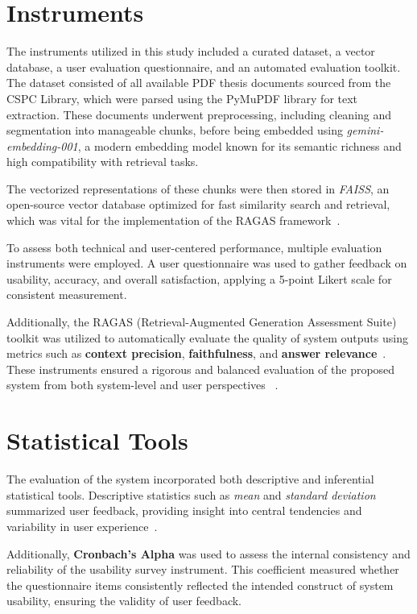 \begin{refsection}
\section{Instruments}


The instruments utilized in this study included a curated dataset, a vector database, a user evaluation questionnaire, and an automated evaluation toolkit. The dataset consisted of all available PDF thesis documents sourced from the CSPC Library, which were parsed using the PyMuPDF library for text extraction. These documents underwent preprocessing, including cleaning and segmentation into manageable chunks, before being embedded using \textit{gemini-embedding-001}, a modern embedding model known for its semantic richness and high compatibility with retrieval tasks.


The vectorized representations of these chunks were then stored in \textit{FAISS}, an open-source vector database optimized for fast similarity search and retrieval, which was vital for the implementation of the RAGAS framework~\cite{trychroma2023chroma}.

To assess both technical and user-centered performance, multiple evaluation instruments were employed. A user questionnaire was used to gather feedback on usability, accuracy, and overall satisfaction, applying a 5-point Likert scale for consistent measurement.

Additionally, the RAGAS (Retrieval-Augmented Generation Assessment Suite) toolkit was utilized to automatically evaluate the quality of system outputs using metrics such as \textbf{context precision}, \textbf{faithfulness}, and \textbf{answer relevance}~\cite{shinn2023ragas}. These instruments ensured a rigorous and balanced evaluation of the proposed system from both system-level and user perspectives~ \cite{lin2021bert}.

\section{Statistical Tools}

The evaluation of the system incorporated both descriptive and inferential statistical tools. Descriptive statistics such as \textit{mean} and \textit{standard deviation} summarized user feedback, providing insight into central tendencies and variability in user experience~\cite{holmes2023chatbot}.

Additionally, \textbf{Cronbach’s Alpha} was used to assess the internal consistency and reliability of the usability survey instrument. This coefficient measured whether the questionnaire items consistently reflected the intended construct of system usability, ensuring the validity of user feedback.


\end{refsection}
